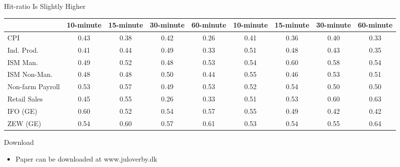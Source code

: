 \documentclass[final]{beamer}
\begin{document}
\begin{frame}
\begin{columns}[t]
\begin{column}{.53 \linewidth}
\begin{columns}[t]
\begin{column}{.48 \linewidth}
\begin{block}{Hit-ratio Is Slightly Higher}
\begin{table}
{\begin{tabular}{@{} l c c c c c c c c }
\midrule
& 10-minute & 15-minute & 30-minute & 60-minute& 10-minute & 15-minute & 30-minute & 60-minute\\
\midrule
CPI &       0.43 &       0.38 &       0.42 &       0.26 &       0.41 &       0.36 &       0.40 &       0.33 \\
Ind. Prod. &       0.41 &       0.44 &       0.49 &       0.33 &       0.51 &       0.48 &       0.43 &       0.35 \\
ISM Man. &       0.49 &       0.52 &       0.48 &       0.53 &       0.54 &       0.60 &       0.58 &       0.54 \\
ISM Non-Man. &       0.48 &       0.48 &       0.50 &       0.44 &       0.55 &       0.46 &       0.53 &       0.51 \\
Non-farm Payroll &       0.53 &       0.57 &       0.49 &       0.53 &       0.52 &       0.54 &       0.50 &       0.50 \\
Retail Sales &       0.45 &       0.55 &       0.26 &       0.33 &       0.51 &       0.53 &       0.60 &       0.63 \\
IFO (GE) &       0.60 &       0.52 &       0.54 &       0.57 &       0.55 &       0.49 &       0.42 &       0.42 \\
ZEW (GE) &       0.54 &       0.60 &       0.57 &       0.61 &       0.53 &       0.54 &       0.55 &       0.64 \\
\bottomrule
\end{tabular}
}
\end{table}
\end{block}%

\vspace{1.7 cm}%

%
%
%
\begin{block}{Download}
\begin{itemize}

\item Paper can be downloaded at www.juloverby.dk


\end{itemize}
\end{block}
\end{column}
\end{columns}
\end{column}
\end{columns}
\end{frame}
\end{document}
